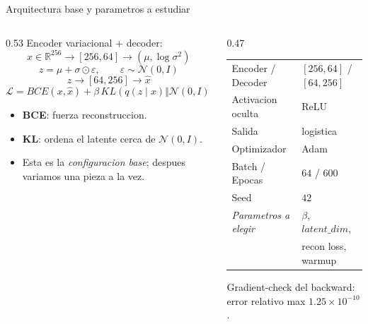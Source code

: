\documentclass[aspectratio=169, 10pt]{beamer}
\begin{document}
\begin{frame}{Arquitectura base y parametros a estudiar}
  \begin{columns}[T]
    \begin{column}{0.53\textwidth}
      Encoder variacional + decoder:
      \[
        x \in \mathbb{R}^{256} \to [256,64] \to (\mu, \log\sigma^2)
      \]
      \[
        z = \mu + \sigma \odot \varepsilon, \qquad \varepsilon \sim \mathcal{N}(0,I)
      \]
      \[
        z \to [64,256] \to \hat{x}
      \]
      \vspace{0.3em}
      \[
        \mathcal{L} = BCE(x,\hat{x}) + \beta\,KL(q(z\mid x)\Vert\mathcal{N}(0,I))
      \]
      \vspace{0.3em}
      \begin{itemize}
        \item \textbf{BCE}: fuerza reconstruccion.
        \item \textbf{KL}: ordena el latente cerca de $\mathcal{N}(0,I)$.
        \item Esta es la \emph{configuracion base}; despues variamos una pieza a la vez.
      \end{itemize}
    \end{column}
    \begin{column}{0.47\textwidth}
      \begin{table}\scriptsize
        \begin{tabular}{ll}
          \toprule
          Encoder / Decoder & $[256,64]$ / $[64,256]$ \\
          Activacion oculta & ReLU \\
          Salida & logistica \\
          Optimizador & Adam \\
          Batch / Epocas & $64$ / $600$ \\
          Seed & $42$ \\
          \midrule
          \textit{Parametros a elegir} & $\beta$, $latent\_dim$, \\
                                        & recon loss, warmup \\
          \bottomrule
        \end{tabular}
      \end{table}
      \vspace{0.4em}
      Gradient-check del backward:\\
      error relativo max \textbf{$1.25\times 10^{-10}$}.
    \end{column}
  \end{columns}
\end{frame}
\end{document}
